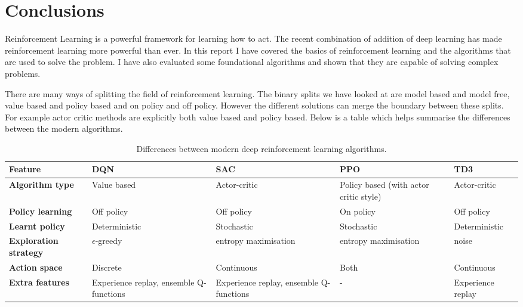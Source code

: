 \chapter{Conclusions}\label{C:con}

Reinforcement Learning is a powerful framework for learning how to act. The recent combination of addition of deep learning has made reinforcement learning more powerful than ever. In this report I have covered the basics of reinforcement learning and the algorithms that are used to solve the problem. I have also evaluated some foundational algorithms and shown that they are capable of solving complex problems. 

There are many ways of splitting the field of reinforcement learning. The binary splits we have looked at are model based and model free, value based and policy based and on policy and off policy. However the different solutions can merge the boundary between these splits. For example actor critic methods are explicitly both value based and policy based. Below is a table which helps summarise the differences between the modern algorithms.

\begin{table}[h]
    \footnotesize
    \centering
    \renewcommand{\arraystretch}{1.4} %
    \begin{tabularx}{\textwidth}{p{1.3cm} X X X X}
        \hline
        \textbf{Feature} & \textbf{DQN} & \textbf{SAC} & \textbf{PPO} & \textbf{TD3} \\
        \hline
        \textbf{Algorithm type}       & Value based      & Actor-critic         & Policy based (with actor critic style)              & Actor-critic  \\
        \textbf{Policy learning}      & Off policy        & Off policy           & On policy            & Off policy    \\
        \textbf{Learnt policy}        & Deterministic     & Stochastic           & Stochastic           & Deterministic \\
        \textbf{Exploration strategy} & $\epsilon$-greedy & entropy maximisation & entropy maximisation & noise         \\
        \textbf{Action space}         & Discrete          & Continuous           & Both                 & Continuous    \\
        \textbf{Extra features} & Experience replay, ensemble Q-functions & Experience replay, ensemble Q-functions & - & Experience replay \\
        \hline
    \end{tabularx}
    \caption{Differences between modern deep reinforcement learning algorithms.}
\end{table}

